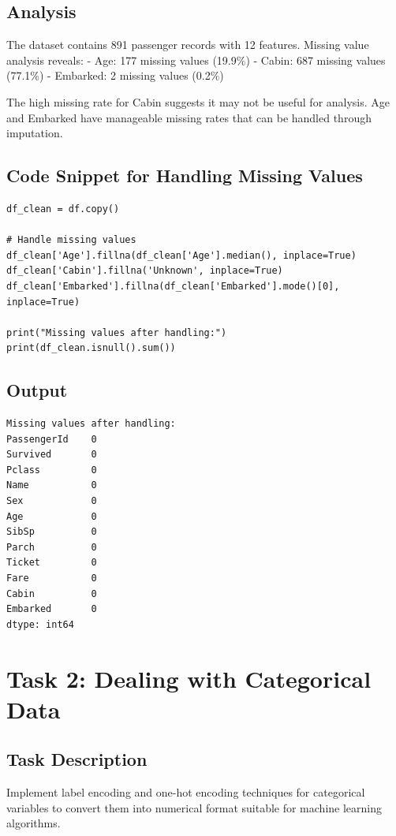 \documentclass[12pt,a4paper]{article}
\begin{document}
\subsection{Analysis}
The dataset contains 891 passenger records with 12 features. Missing value analysis reveals:
- Age: 177 missing values (19.9\%)
- Cabin: 687 missing values (77.1\%)
- Embarked: 2 missing values (0.2\%)

The high missing rate for Cabin suggests it may not be useful for analysis. Age and Embarked have manageable missing rates that can be handled through imputation.

\subsection{Code Snippet for Handling Missing Values}
\begin{lstlisting}
df_clean = df.copy()

# Handle missing values
df_clean['Age'].fillna(df_clean['Age'].median(), inplace=True)
df_clean['Cabin'].fillna('Unknown', inplace=True)
df_clean['Embarked'].fillna(df_clean['Embarked'].mode()[0], inplace=True)

print("Missing values after handling:")
print(df_clean.isnull().sum())
\end{lstlisting}

\subsection{Output}
\begin{verbatim}
Missing values after handling:
PassengerId    0
Survived       0
Pclass         0
Name           0
Sex            0
Age            0
SibSp          0
Parch          0
Ticket         0
Fare           0
Cabin          0
Embarked       0
dtype: int64
\end{verbatim}

\section{Task 2: Dealing with Categorical Data}

\subsection{Task Description}
Implement label encoding and one-hot encoding techniques for categorical variables to convert them into numerical format suitable for machine learning algorithms.
\end{document}
